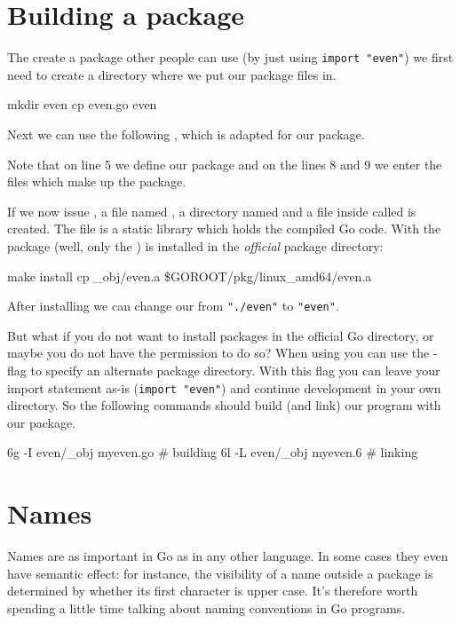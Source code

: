 \section{Building a package}
\label{sec:building a package}
The create a package other people can use (by just using
\lstinline{import "even"}) we first need to create a directory
where we put our package files in. 
\begin{display}
\pr mkdir even
\pr cp even.go even
\end{display}
\noindent{}Next we 
can use the following 
, which 
is adapted for our  package.

Note that on line 5 we define our  package and on the
lines 8 and 9 we enter the files which make up the package.

If we now issue , a file named , a directory
named  and a file inside  called  
is created. The file  is a static library which holds
the compiled Go code.
With  the package (well, only the ) is installed in the \emph{official}
package directory:
\begin{display}
\pr make install
cp \_obj/even.a \$GOROOT/pkg/linux\_amd64/even.a
\end{display}
\noindent{}After installing we can change our  from
\lstinline{"./even"} to \lstinline{"even"}.

But what if you do not want to install packages in the official Go
directory, or maybe you do not have the permission to do so? When using
 you can use the -flag to specify an alternate
package directory. With this flag you can leave your import statement
as-is (\lstinline{import "even"}) and continue development in your
own directory. So the following commands should build (and link) our
 program with our package.
\begin{display}
\pr 6g -I even/\_obj myeven.go	# building
\pr 6l -L even/\_obj myeven.6	# linking
\end{display}

\section{Names}
Names are as important in Go as in any other language. In some cases
they even have semantic effect: for instance, the visibility of a name
outside a package is determined by whether its first character is upper
case. It's therefore worth spending a little time talking about naming
conventions in Go programs.

